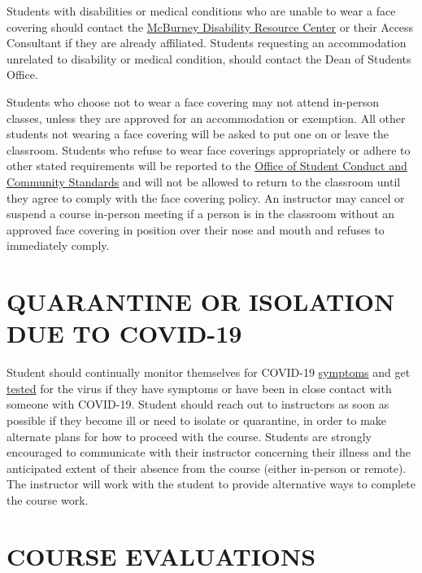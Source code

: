 \documentclass[11pt,man]{article}
\begin{document}
Students with disabilities or medical conditions who are unable to wear
a face covering should contact the
\href{https://mcburney.wisc.edu/}{McBurney Disability Resource Center}
or their Access Consultant if they are already affiliated. Students
requesting an accommodation unrelated to disability or medical
condition, should contact the Dean of Students Office.

Students who choose not to wear a face covering may not attend in-person
classes, unless they are approved for an accommodation or exemption. All
other students not wearing a face covering will be asked to put one on
or leave the classroom. Students who refuse to wear face coverings
appropriately or adhere to other stated requirements will be reported to
the \href{https://conduct.students.wisc.edu/}{Office of Student Conduct
and Community Standards} and will not be allowed to return to the
classroom until they agree to comply with the face covering policy. An
instructor may cancel or suspend a course in-person meeting if a person
is in the classroom without an approved face covering in position over
their nose and mouth and refuses to immediately comply.

\hypertarget{quarantine-or-isolation-due-to-covid-19}{%
\section{QUARANTINE OR ISOLATION DUE TO
COVID-19}\label{quarantine-or-isolation-due-to-covid-19}}

Student should continually monitor themselves for COVID-19
\href{https://healthscreen.wisc.edu/}{symptoms} and get
\href{https://www.uhs.wisc.edu/medical/testing/}{tested} for the virus
if they have symptoms or have been in close contact with someone with
COVID-19. Student should reach out to instructors as soon as possible if
they become ill or need to isolate or quarantine, in order to make
alternate plans for how to proceed with the course. Students are
strongly encouraged to communicate with their instructor concerning
their illness and the anticipated extent of their absence from the
course (either in-person or remote). The instructor will work with the
student to provide alternative ways to complete the course work.

\hypertarget{course-evaluations}{%
\section{COURSE EVALUATIONS}\label{course-evaluations}}
\end{document}
